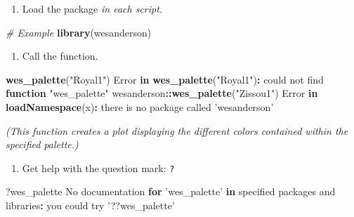 \documentclass[]{book}
\newenvironment{Shaded}{\begin{snugshade}}{\end{snugshade}}
\newcommand{\CommentTok}[1]{\textcolor[rgb]{0.56,0.35,0.01}{\textit{#1}}}
\newcommand{\ControlFlowTok}[1]{\textcolor[rgb]{0.13,0.29,0.53}{\textbf{#1}}}
\newcommand{\KeywordTok}[1]{\textcolor[rgb]{0.13,0.29,0.53}{\textbf{#1}}}
\newcommand{\NormalTok}[1]{#1}
\newcommand{\OperatorTok}[1]{\textcolor[rgb]{0.81,0.36,0.00}{\textbf{#1}}}
\newcommand{\StringTok}[1]{\textcolor[rgb]{0.31,0.60,0.02}{#1}}
\providecommand{\tightlist}{%
  \setlength{\itemsep}{0pt}\setlength{\parskip}{0pt}}
\begin{document}
\begin{enumerate}
\def\labelenumi{\arabic{enumi}.}
\setcounter{enumi}{1}
\tightlist
\item
  Load the package \emph{in each script.}
\end{enumerate}

\begin{Shaded}
\begin{Highlighting}[]
\CommentTok{# Example}
\KeywordTok{library}\NormalTok{(wesanderson)}
\end{Highlighting}
\end{Shaded}

\begin{enumerate}
\def\labelenumi{\arabic{enumi}.}
\setcounter{enumi}{2}
\tightlist
\item
  Call the function.
\end{enumerate}

\begin{Shaded}
\begin{Highlighting}[]
\KeywordTok{wes_palette}\NormalTok{(}\StringTok{"Royal1"}\NormalTok{)}
\NormalTok{Error }\ControlFlowTok{in} \KeywordTok{wes_palette}\NormalTok{(}\StringTok{"Royal1"}\NormalTok{)}\OperatorTok{:}\StringTok{ }\NormalTok{could not find }\ControlFlowTok{function} \StringTok{"wes_palette"}
\NormalTok{wesanderson}\OperatorTok{::}\KeywordTok{wes_palette}\NormalTok{(}\StringTok{"Zissou1"}\NormalTok{)}
\NormalTok{Error }\ControlFlowTok{in} \KeywordTok{loadNamespace}\NormalTok{(x)}\OperatorTok{:}\StringTok{ }\NormalTok{there is no package called }\StringTok{'wesanderson'}
\end{Highlighting}
\end{Shaded}

\emph{(This function creates a plot displaying the different colors contained within the specified palette.)}

\begin{enumerate}
\def\labelenumi{\arabic{enumi}.}
\setcounter{enumi}{3}
\tightlist
\item
  Get help with the question mark: \texttt{?}
\end{enumerate}

\begin{Shaded}
\begin{Highlighting}[]
\NormalTok{?wes_palette}
\NormalTok{No documentation }\ControlFlowTok{for} \StringTok{'wes_palette'} \ControlFlowTok{in}\NormalTok{ specified packages and libraries}\OperatorTok{:}
\NormalTok{you could try }\StringTok{'??wes_palette'}
\end{Highlighting}
\end{Shaded}
\end{document}
